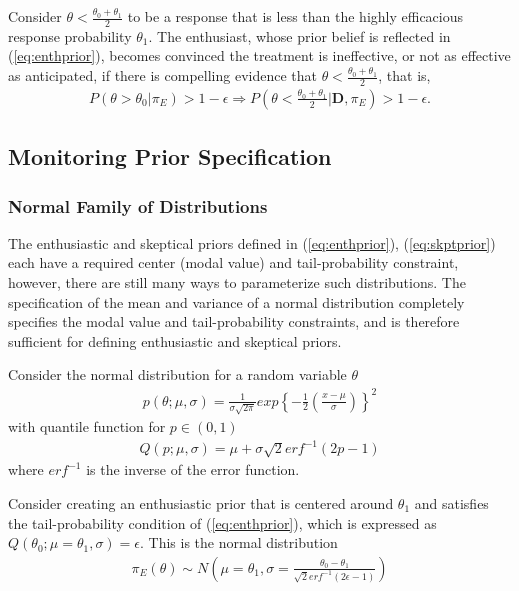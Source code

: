 \documentclass[12pt]{article}
\begin{document}
Consider $\theta<\frac{\theta_0+\theta_1}{2}$ to be a response that is less than the highly efficacious response probability $\theta_1$. The enthusiast, whose prior belief is reflected in (\ref{eq:enthprior}), becomes convinced the treatment is ineffective, or not as effective as anticipated, if there is compelling evidence that $\theta<\frac{\theta_0+\theta_1}{2}$, that is, 
\begin{align}
P(\theta>\theta_0|\pi_{E})>1-\epsilon\Rightarrow P\left(\theta<\frac{\theta_0+\theta_1}{2}\Big| \mathbf{D},\pi_{E}\right)>1-\epsilon.
\end{align}
%
\subsection{Monitoring Prior Specification}
\subsubsection{Normal Family of Distributions}
The enthusiastic and skeptical priors defined in (\ref{eq:enthprior}), (\ref{eq:skptprior}) each have a required center (modal value) and tail-probability constraint, however, there are still many ways to parameterize such distributions. The specification of the mean and variance of a normal distribution completely specifies the modal value and tail-probability constraints, and is therefore sufficient for defining enthusiastic and skeptical priors.

Consider the normal distribution for a random variable $\theta$
\begin{align}
p(\theta;\mu,\sigma)=\frac{1}{\sigma\sqrt{2\pi}}exp\left\{-\frac{1}{2}\left(\frac{x-\mu}{\sigma}\right)\right\}^2
\end{align}
with quantile function for $p\in(0,1)$
\begin{align}
Q(p;\mu,\sigma)=\mu+\sigma\sqrt{2}erf^{-1}(2p-1)
\end{align}
where $erf^{-1}$ is the inverse of the error function.

Consider creating an enthusiastic prior that is centered around $\theta_1$ and satisfies the tail-probability condition of (\ref{eq:enthprior}), which is expressed as $Q(\theta_0;\mu=\theta_1,\sigma)=\epsilon$. This is the normal distribution 
\begin{align}\label{eq:enthsd}
\pi_E(\theta)\sim N\left(\mu=\theta_1,\sigma=\frac{\theta_0-\theta_1}{\sqrt{2}erf^{-1}(2\epsilon-1)}\right)
\end{align}
\end{document}
